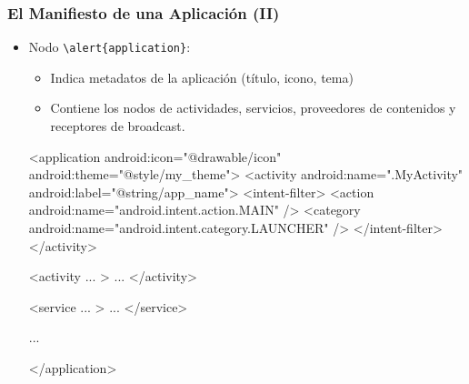 \documentclass[hyperref={pdfpagelabels=true},ucs]{beamer}
\begin{document}
\begin{frame}[fragile]
\frametitle{El Manifiesto de una Aplicación (II)}  

\begin{itemize}

\item Nodo \Verb|\alert{application}|:
  \begin{itemize}
  \item Indica metadatos de la aplicación (título, icono, tema)
  \item Contiene los nodos de actividades, servicios, proveedores de
    contenidos y receptores de broadcast.
  \end{itemize}

\begin{tiny}
\begin{block}{}
\begin{xml}
<application android:icon="@drawable/icon"
             android:theme="@style/my_theme">
  <activity android:name=".MyActivity" android:label="@string/app_name">
    <intent-filter>
      <action android:name="android.intent.action.MAIN" />
      <category android:name="android.intent.category.LAUNCHER" />
    </intent-filter>
  </activity>

  <activity ... >
    ...
  </activity>

  <service ... >
    ...
  </service>

  ...

</application>
\end{xml}
\end{block}
\end{tiny}

\end{itemize}

\end{frame}
\end{document}
